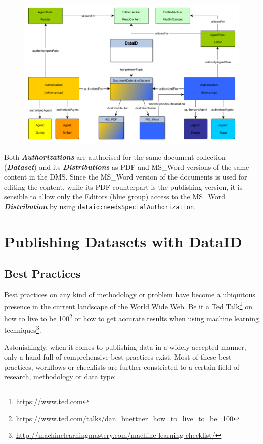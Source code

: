 \documentclass[a4paper,english,twoside,BCOR1.5cm,headsepline,DIV12,appendixprefix,final,12pt]{scrbook}
\newcommand{\prop}[1]{{{\texttt{#1}}}}
\newcommand{\important}[1]{\textbf{\textit{#1}}}
\newcommand\footnoteurl[1]{\footnote{\scriptsize\url{#1}}}
\begin{document}
\begin{figure}[!htbp]
\centering
  \includegraphics[width=\textwidth]{images/DmsExample.png}
  \label{fig:dlaxioms}
\end{figure}

Both \important{Authorizations} are authorised for the same document collection (\important{Dataset}) and its \important{Distributions} as PDF and MS\_Word versions of the same content in the DMS. Since the MS\_Word version of the documents is used for editing the content, while its PDF counterpart is the publishing version, it is sensible to allow only the Editors (blue group) access to the MS\_Word \important{Distribution} by using \prop{dataid:needsSpecialAuthorization}. 

\chapter{Publishing Datasets with DataID}
\label{chap:bestprctice}

\section{Best Practices} 
\label{sec:bestprctice}
Best practices on any kind of methodology or problem have become a ubiquitous presence in the current landscape of the World Wide Web. Be it a Ted Talk\footnoteurl{https://www.ted.com} on how to live to be 100\footnoteurl{https://www.ted.com/talks/dan_buettner_how_to_live_to_be_100} or how to get accurate results when using machine learning techniques\footnoteurl{http://machinelearningmastery.com/machine-learning-checklist/}.

Astonishingly, when it comes to publishing data in a widely accepted manner, only a hand full of comprehensive best practices exist. Most of these best practices, workflows or checklists are further constricted to a certain field of research, methodology or data type:
\end{document}
